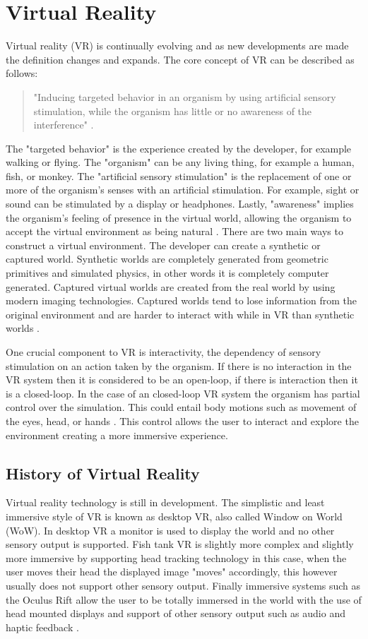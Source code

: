\chapter{Virtual Reality}
Virtual reality (VR) is continually evolving and as new developments are made the definition changes and expands. The core concept of VR can be described as follows:  
	\begin{quote}
	"Inducing targeted behavior in an organism by using artificial sensory stimulation, while the organism has little or no awareness of the interference" \cite{LaValle2017}.
	\end{quote} 
The "targeted behavior" is the experience created by the developer, for example walking or flying. The "organism" can be any living thing, for example a human, fish, or monkey. The "artificial sensory stimulation" is the replacement of one or more of the organism's senses with an artificial stimulation. For example, sight or sound can be stimulated by a display or headphones. Lastly, "awareness" implies the organism's feeling of presence in the virtual world, allowing the organism to accept the virtual environment as being natural \cite{LaValle2017}. 
\label{key}
There are two main ways to construct a virtual environment. The developer can create a synthetic or captured world. Synthetic worlds are completely generated from geometric primitives and simulated physics, in other words it is completely computer generated. Captured virtual worlds are created from the real world by using modern imaging technologies. Captured worlds tend to lose information from the original environment and are harder to interact with while in VR than synthetic worlds \cite{LaValle2017}.

One crucial component to VR is interactivity, the dependency of sensory stimulation on an action taken by the organism. If there is no interaction in the VR system then it is considered to be an open-loop, if there is interaction then it is a closed-loop. In the case of an closed-loop VR system the organism has partial control over the simulation. This could entail body motions such as movement of the eyes, head, or hands \cite{LaValle2017}. This control allows the user to interact and explore the environment creating a more immersive experience. 

\section{History of Virtual Reality}
Virtual reality technology is still in development. The simplistic and least immersive style of VR is known as desktop VR, also called Window on World (WoW). In desktop VR a monitor is used to display the world and no other sensory output is supported. Fish tank VR is slightly more complex and slightly more immersive by supporting head tracking technology in this case, when the user moves their head the displayed image "moves" accordingly, this however usually does not support other sensory output. Finally immersive systems such as the Oculus Rift allow the user to be totally immersed in the world with the use of head mounted displays and support of other sensory output such as audio and haptic feedback \cite{Mazuryk}.


